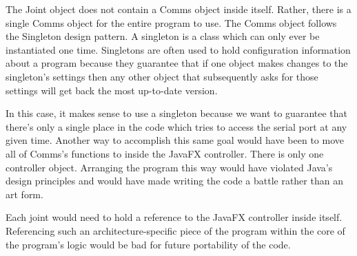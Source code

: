 \noindent The Joint object does not contain a Comms object inside itself. Rather, there is a single Comms object for the entire program to use. The Comms object follows the Singleton design pattern. A singleton is a class which can only ever be instantiated one time. Singletons are often used to hold configuration information about a program because they guarantee that if one object makes changes to the singleton's settings then any other object that subsequently asks for those settings will get back the most up-to-date version.

\noindent In this case, it makes sense to use a singleton because we want to guarantee that there's only a single place in the code which tries to access the serial port at any given time. Another way to accomplish this same goal would have been to move all of Comms's functions to inside the JavaFX controller. There is only one controller object. Arranging the program this way would have violated Java's design principles and would have made writing the code a battle rather than an art form. %

\noindent Each joint would need to hold a reference to the JavaFX controller inside itself. Referencing such an architecture-specific piece of the program within the core of the program's logic would be bad for future portability of the code. 

